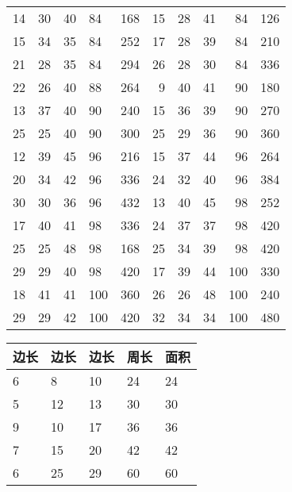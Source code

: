 \documentclass[12pt]{article}
\begin{document}
\begin{table}[H]
\begin{tabular}{lllllrrrrr}
14 & 30 & 40 & 84 & 168 &	15 & 28 & 41 & 84 & 126\\
15 & 34 & 35 & 84 & 252 &	17 & 28 & 39 & 84 & 210\\
21 & 28 & 35 & 84 & 294 &	26 & 28 & 30 & 84 & 336\\
22 & 26 & 40 & 88 & 264 &	9  & 40 & 41 & 90 & 180\\
13 & 37 & 40 & 90 & 240 &	15 & 36 & 39 & 90 & 270\\
25 & 25 & 40 & 90 & 300 &	25 & 29 & 36 & 90 & 360\\
12 & 39 & 45 & 96 & 216 &	15 & 37 & 44 & 96 & 264\\
20 & 34 & 42 & 96 & 336 &	24 & 32 & 40 & 96 & 384\\
30 & 30 & 36 & 96 & 432 &	13 & 40 & 45 & 98 & 252\\
17 & 40 & 41 & 98 & 336 &	24 & 37 & 37 & 98 & 420\\
25 & 25 & 48 & 98 & 168 &	25 & 34 & 39 & 98 & 420\\
29 & 29 & 40 & 98 & 420 &	17 & 39 & 44 & 100& 330\\
18 & 41 & 41 & 100 & 360&	26 & 26 & 48 & 100& 240\\
29 & 29 & 42 & 100 & 420&	32 & 34 & 34 & 100& 480\\
\bottomrule
\end{tabular}%
\end{table}%

\begin{table}[H]
\centering
{}
\begin{tabular}{lllll}
\toprule
边长&边长&边长&周长&面积 \\
\midrule
6 & 8  & 10 & 24 & 24 \\
5 & 12 & 13 & 30 & 30 \\
9 & 10 & 17 & 36 & 36 \\
7 & 15 & 20 & 42 & 42 \\
6 & 25 & 29 & 60 & 60 \\
\bottomrule
\end{tabular}%
\end{table}%
\end{document}
